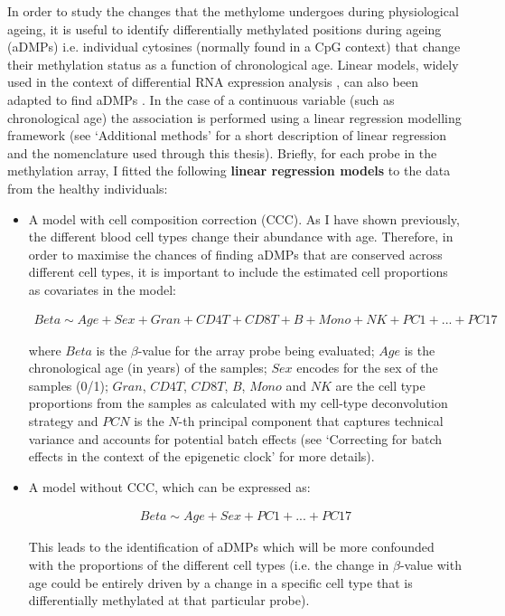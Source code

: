 \bigskip

In order to study the changes that the methylome undergoes during physiological ageing, it is useful to identify differentially methylated positions during ageing (\acrshort{aDMPs}) i.e. individual cytosines (normally found in a CpG context) that change their methylation status as a function of chronological age. Linear models, widely used in the context of differential RNA expression analysis \cite{Ritchie2015}, can also been adapted to find aDMPs \cite{Zhuang2012,Teschendorff2018}. In the case of a continuous variable (such as chronological age) the association is performed using a linear regression modelling framework \cite{Zhuang2012} (see `Additional methods' for a short description of linear regression and the nomenclature used through this thesis). Briefly, for each probe in the methylation array, I fitted the following \textbf{linear regression models} to the data from the healthy individuals:

\begin{itemize}

	\item A model with cell composition correction (\acrshort{CCC}). As I have shown previously, the different blood cell types change their abundance with age. Therefore, in order to maximise the chances of finding aDMPs that are conserved across different cell types, it is important to include the estimated cell proportions as covariates in the model:
	
	\begin{align}
	Beta \sim Age + Sex+ Gran + CD4T + CD8T + B + Mono + NK + PC1 + ... + PC17
	\end{align}
	
	where $Beta$ is the $\beta$-value for the array probe being evaluated; $Age$ is the chronological age (in years) of the samples; $Sex$ encodes for the sex of the samples (0/1); $Gran$, $CD4T$, $CD8T$, $B$, $Mono$ and $NK$ are the cell type proportions from the samples as calculated with my cell-type deconvolution strategy and $PCN$ is the $N$-th principal component that captures technical variance and accounts for potential batch effects (see `Correcting for batch effects in the context of the epigenetic clock' for more details).    
	
	\item A model without CCC, which can be expressed as:
	
	\begin{align}
	Beta \sim Age + Sex+ PC1 + ... + PC17
	\end{align}
	
	This leads to the identification of aDMPs which will be more confounded with the proportions of the different cell types (i.e. the change in $\beta$-value with age could be entirely driven by a change in a specific cell type that is differentially methylated at that particular probe).
	
\end{itemize}

